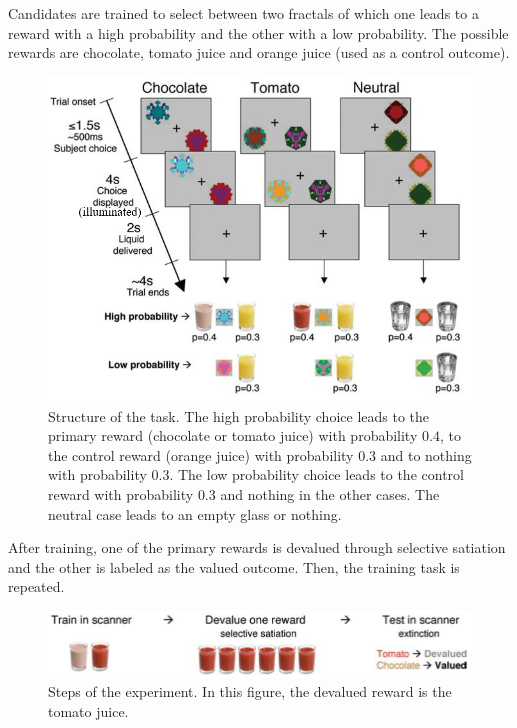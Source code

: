 \begin{casestudy}
    Candidates are trained to select between two fractals of which 
    one leads to a reward with a high probability and the other with a low probability.
    The possible rewards are chocolate, tomato juice and orange juice (used as a control outcome).

    \begin{figure}[H]
        \centering
        \includegraphics[width=0.45\linewidth]{./img/human_goal_directed_experiment.png}
        \caption{
            Structure of the task. The high probability choice leads to the primary reward (chocolate or tomato juice) with probability $0.4$, 
            to the control reward (orange juice) with probability $0.3$ and to nothing with probability $0.3$.
            The low probability choice leads to the control reward with probability $0.3$ and nothing in the other cases.
            The neutral case leads to an empty glass or nothing.
        }
    \end{figure}

    After training, one of the primary rewards is devalued through selective satiation and the other is labeled as the valued outcome.
    Then, the training task is repeated.
    \begin{figure}[H]
        \centering
        \includegraphics[width=0.55\linewidth]{./img/human_goal_directed_experiment2.png}
        \caption{
            Steps of the experiment. In this figure, the devalued reward is the tomato juice.        
        }
    \end{figure}


\end{casestudy}
